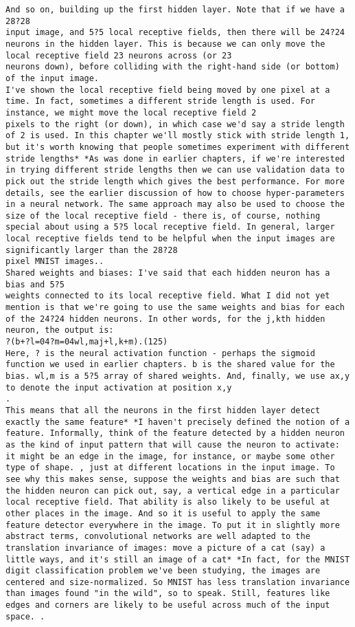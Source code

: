 \begin{lstlisting}
And so on, building up the first hidden layer. Note that if we have a 28?28
input image, and 5?5 local receptive fields, then there will be 24?24 neurons in the hidden layer. This is because we can only move the local receptive field 23 neurons across (or 23
neurons down), before colliding with the right-hand side (or bottom) of the input image.
I've shown the local receptive field being moved by one pixel at a time. In fact, sometimes a different stride length is used. For instance, we might move the local receptive field 2
pixels to the right (or down), in which case we'd say a stride length of 2 is used. In this chapter we'll mostly stick with stride length 1, but it's worth knowing that people sometimes experiment with different stride lengths* *As was done in earlier chapters, if we're interested in trying different stride lengths then we can use validation data to pick out the stride length which gives the best performance. For more details, see the earlier discussion of how to choose hyper-parameters in a neural network. The same approach may also be used to choose the size of the local receptive field - there is, of course, nothing special about using a 5?5 local receptive field. In general, larger local receptive fields tend to be helpful when the input images are significantly larger than the 28?28
pixel MNIST images..
Shared weights and biases: I've said that each hidden neuron has a bias and 5?5
weights connected to its local receptive field. What I did not yet mention is that we're going to use the same weights and bias for each of the 24?24 hidden neurons. In other words, for the j,kth hidden neuron, the output is: 
?(b+?l=04?m=04wl,maj+l,k+m).(125)
Here, ? is the neural activation function - perhaps the sigmoid function we used in earlier chapters. b is the shared value for the bias. wl,m is a 5?5 array of shared weights. And, finally, we use ax,y to denote the input activation at position x,y
.
This means that all the neurons in the first hidden layer detect exactly the same feature* *I haven't precisely defined the notion of a feature. Informally, think of the feature detected by a hidden neuron as the kind of input pattern that will cause the neuron to activate: it might be an edge in the image, for instance, or maybe some other type of shape. , just at different locations in the input image. To see why this makes sense, suppose the weights and bias are such that the hidden neuron can pick out, say, a vertical edge in a particular local receptive field. That ability is also likely to be useful at other places in the image. And so it is useful to apply the same feature detector everywhere in the image. To put it in slightly more abstract terms, convolutional networks are well adapted to the translation invariance of images: move a picture of a cat (say) a little ways, and it's still an image of a cat* *In fact, for the MNIST digit classification problem we've been studying, the images are centered and size-normalized. So MNIST has less translation invariance than images found "in the wild", so to speak. Still, features like edges and corners are likely to be useful across much of the input space. .

\end{lstlisting}
